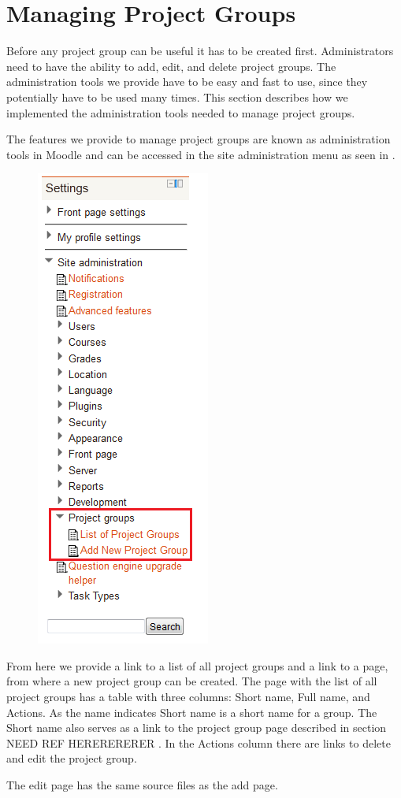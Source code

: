 \section{Managing Project Groups} %
Before any project group can be useful it has to be created first.
Administrators need to have the ability to add, edit, and delete project groups.
The administration tools we provide have to be easy and fast to use, since they potentially have to be used many times.
This section describes how we implemented the administration tools needed to manage project groups.

The features we provide to manage project groups are known as administration tools in Moodle and can be accessed in the site administration menu as seen in .

\begin{figure}[htb]
	\centering
		\includegraphics[scale=0.75]{images/admin-navigation.png}
	\label{fig:navigation}
\end{figure}

From here we provide a link to a list of all project groups and a link to a page, from where a new project group can be created.
The page with the list of all project groups has a table with three columns: Short name, Full name, and Actions.
As the name indicates Short name is a short name for a group. 
The Short name also serves as a link to the project group page described in section NEED REF HERERERERER .
In the Actions column there are links to delete and edit the project group.

The edit page has the same source files as the add page.